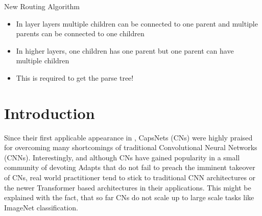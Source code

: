 \documentclass{article}
\begin{document}
New Routing Algorithm
\begin{itemize}
	\item In layer layers multiple children can be connected to one parent and multiple parents can be connected to one children
	\item In higher layers, one children has one parent but one parent can have multiple children
	\item This is required to get the parse tree!
\end{itemize}

\section{Introduction}

Since their first applicable appearance in \cite{DBLP:conf/nips/SabourFH17}, CapsNets (CNs) were highly praised for overcoming many shortcomings of traditional Convolutional Neural Networks (CNNs). Interestingly, and although CNs have gained popularity in a small community of devoting Adapts that do not fail to preach the imminent takeover of CNs, real world practitioner tend to stick to traditional CNN architectures or the newer Transformer based architectures in their applications. This might be explained with the fact, that so far CNs do not scale up to large scale tasks like ImageNet classification.
\end{document}
